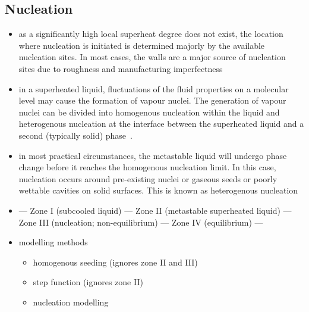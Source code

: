 \subsection{Nucleation}
\begin{itemize}
	\item as a significantly high local superheat degree does not exist, the location where nucleation is initiated is determined majorly by the available nucleation sites. In most cases, the walls are a major source of nucleation sites due to roughness and manufacturing imperfectness~\cite{liaoFlashingEvaporationDifferent2013}
	\item in a superheated liquid, fluctuations of the fluid properties on a molecular level may cause the formation of vapour nuclei. The generation of vapour nuclei can be divided into homogenous nucleation within the liquid and heterogenous nucleation at the interface between the superheated liquid and a second (typically solid) phase~\cite{Gartner2024-zh}.
	\item in most practical circumstances, the metastable liquid will undergo phase change before it reaches the homogenous nucleation limit. In this case, nucleation occurs around pre-existing nuclei or gaseous seeds or poorly wettable cavities on solid surfaces. This is known as heterogenous nucleation~\cite{liaoComputationalModellingFlash2017} 
	\item \scriptsize--- Zone I (subcooled liquid) --- Zone II (metastable superheated liquid) --- Zone III (nucleation; non-equilibrium) --- Zone IV (equilibrium) --- \normalsize
	\item modelling methods \begin{itemize}
		\item homogenous seeding (ignores zone II and III)
		\item step function (ignores zone II)
		\item nucleation modelling
	\end{itemize} 
\end{itemize}

